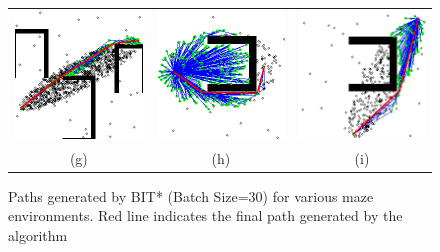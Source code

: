 \documentclass{article}
\begin{document}
\begin{figure}
{\begin{tabular}{ccc}
			\includegraphics[scale=0.45]{imgs/bit_paths/one_per_map/bitstar_result_22754.png} & \includegraphics[scale=0.45]{imgs/bit_paths/one_per_map/bitstar_result_23604.png} & \includegraphics[scale=0.45]{imgs/bit_paths/one_per_map/bitstar_result_23653.png}\\
			(g) & (h) & (i)\\[6pt]
		\end{tabular}
	}
	\caption{Paths generated by BIT* (Batch Size=30) for various maze environments. Red line indicates the final path generated by the algorithm}
	\label{bit:finalpaths}
\end{figure} 
\end{document}
